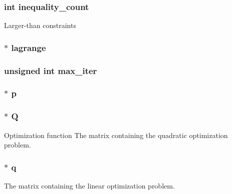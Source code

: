 \subsubsection[{inequality\+\_\+count}]{\setlength{\rightskip}{0pt plus 5cm}int inequality\+\_\+count}\label{structproblem_a0baf6f65eaae279a86d187ef201c1320}
Larger-\/than constraints \hypertarget{structproblem_a988084bf1423637718de8882244149f4}{}
\subsubsection[{lagrange}]{$\ast$ lagrange}\label{structproblem_a988084bf1423637718de8882244149f4}
\hypertarget{structproblem_a58e3dae44c3756ebff55dd1a3907d7e4}{}
\subsubsection[{max\+\_\+iter}]{\setlength{\rightskip}{0pt plus 5cm}unsigned int max\+\_\+iter}\label{structproblem_a58e3dae44c3756ebff55dd1a3907d7e4}
\hypertarget{structproblem_a0b8e7c785036ef0cb64a801257094918}{}
\subsubsection[{p}]{$\ast$ p}\label{structproblem_a0b8e7c785036ef0cb64a801257094918}
\hypertarget{structproblem_ae50fecd2794ca5844d6d01efcf17294c}{}
\subsubsection[{Q}]{$\ast$ Q}\label{structproblem_ae50fecd2794ca5844d6d01efcf17294c}
Optimization function The matrix containing the quadratic optimization problem. \hypertarget{structproblem_a7755407fcbd4345b31d64bbc181af35a}{}
\subsubsection[{q}]{$\ast$ q}\label{structproblem_a7755407fcbd4345b31d64bbc181af35a}
The matrix containing the linear optimization problem. \hypertarget{structproblem_a54cc974fe14b21225c2a940ed2bf1039}{}
